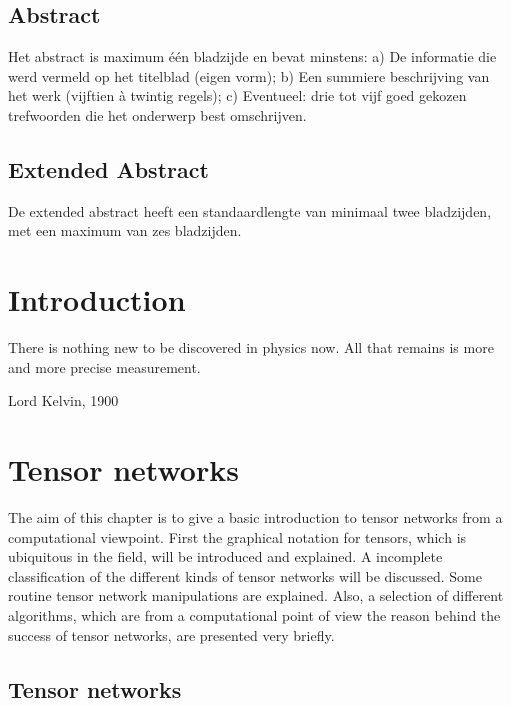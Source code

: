 \documentclass{book}
\newcounter{a}
\newcounter{b}
\begin{document}


\section*{Abstract}

Het abstract is maximum één bladzijde en bevat minstens:
a) De informatie die werd vermeld op het titelblad (eigen vorm);
b) Een summiere beschrijving van het werk (vijftien à twintig regels);
c) Eventueel: drie tot vijf goed gekozen trefwoorden die het onderwerp best
omschrijven.


\section*{Extended Abstract}

De extended abstract heeft een standaardlengte van minimaal twee bladzijden, met een maximum van zes bladzijden.

\tableofcontents


\mainmatter

\chapter{Introduction}

\epigraph{There is nothing new to be discovered in physics now. All that remains is more and more precise measurement.}{Lord Kelvin, 1900}



\chapter{Tensor networks}

The aim of this chapter is to give a basic introduction to tensor networks from a computational viewpoint. First the graphical notation for tensors, which is ubiquitous in the field, will be introduced and explained. A incomplete classification of the different kinds of tensor networks will be discussed. Some routine tensor network manipulations are explained. Also, a selection of different algorithms, which are from a computational point of view the reason behind the success of tensor networks, are presented very briefly.

\section{Tensor networks}
\end{document}
